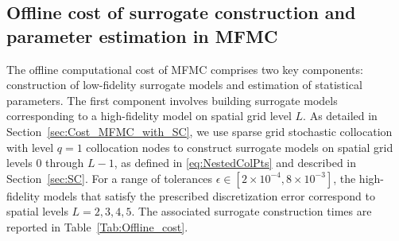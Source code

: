 \subsection{Offline cost of surrogate construction and parameter estimation in MFMC}
The offline computational cost of MFMC comprises two key components: construction of low-fidelity surrogate models and estimation of statistical parameters. The first component involves building surrogate models corresponding to a high-fidelity model on spatial grid level $L$. As detailed in Section~\ref{sec:Cost_MFMC_with_SC}, we use sparse grid stochastic collocation with level $q=1$ collocation nodes to construct surrogate models on spatial grid levels $0$ through $L-1$, as defined in \eqref{eq:NestedColPts} and described in Section~\ref{sec:SC}. For a range of tolerances $\epsilon \in [2\times 10^{-4}, 8\times 10^{-3}]$, the high-fidelity models that satisfy the prescribed discretization error correspond to spatial levels $L = 2,3,4,5$. The associated surrogate construction times are reported in Table~\ref{Tab:Offline_cost}.
%
\begin{table}[ht]
\centering
{}
\caption{Offline costs and pilot sample sizes for surrogate model construction and parameter estimation across tolerances. The second row gives the spatial grid level required to control discretization error. The third and fourth rows report CPU time (in seconds) for constructing sparse grid surrogates (sparse grid level $q=1$ and spatial grid levels $0$ to $L-1$) and performing parameter estimation using the dynamic strategy. The final row lists the corresponding pilot sample sizes.}
\label{Tab:Offline_cost}
\end{table}
%

